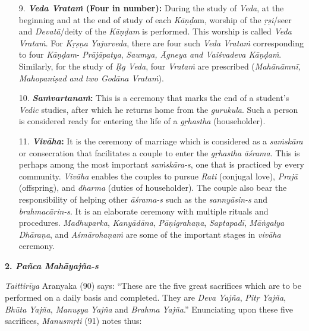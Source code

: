 \begin{enumerate}
\item[9.]
  \textbf{\emph{Veda Vrataṁ} (Four in number):} During the study of \emph{Veda}, at the beginning and at the end of study of each \emph{Kāṇḍa}m, worship of the \emph{ṛṣi}/seer and \emph{Devatā}/deity of the \emph{Kāṇḍam} is performed. This worship is called \emph{Veda Vrataṁ}. For \emph{Kṛṣṇa} \emph{Yajurveda}, there are four such \emph{Veda Vrataṁ} corresponding to four \emph{Kāṇḍam}- \emph{Prājāpatya}, \emph{Saumya, Āgneya and Vaiśvadeva Kāṇḍaṁ}. Similarly, for the study of \emph{Ṛg Veda}, four \emph{Vrataṁ} are prescribed (\emph{Mahānāmnī, Mahopaniṣad and two Godāna Vrataṁ}).
\item[10.]
  \textbf{\emph{Saṁvartanaṁ}:} This is a ceremony that marks the end of a student's \emph{Vedic} studies, after which he returns home from the \emph{gurukula}. Such a person is considered ready for entering the life of a \emph{gṛhastha} (householder).
\item[11.]
  \textbf{\emph{Vivāha}:} It is the ceremony of marriage which is considered as a \emph{saṁskāra} or consecration that facilitates a couple to enter the \emph{gṛhastha} \emph{āśrama}. This is perhaps among the most important \emph{saṁskāra-s}, one that is practiced by every community. \emph{Vivāha} enables the couples to pursue \emph{Rati} (conjugal love), \emph{Prajā} (offspring), and \emph{dharma} (duties of householder). The couple also bear the responsibility of helping other \emph{āśrama-s} such as the \emph{sannyāsin-s} and \emph{brahmacārin-s}. It is an elaborate ceremony with multiple rituals and procedures. \emph{Madhuparka}, \emph{Kanyādāna}, \emph{Pāṇigrahaṇa}, \emph{Saptapadī}, \emph{Māṅgalya Dhāraṇa}, and \emph{Aśmārohaṇaṁ} are some of the important stages in \emph{vivāha} ceremony.
\end{enumerate}

\textbf{2. \emph{Pañca Mahāyajña-s}}

\emph{Taittirīya} Aranyaka (90) says: ``These are the five great sacrifices which are to be performed on a daily basis and completed. They are \emph{Deva} \emph{Yajña}, \emph{Pitṛ} \emph{Yajña}, \emph{Bhūta} \emph{Yajña}, \emph{Manuṣya} \emph{Yajña} and \emph{Brahma} \emph{Yajña}.'' Enunciating upon these five sacrifices, \emph{Manusmṛti} (91) notes thus:

